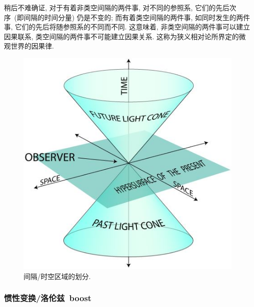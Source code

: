 稍后不难确证, 对于有着非类空间隔的两件事, 对不同的参照系, 它们的先后次序~(即间隔的时间分量) 仍是不变的; 而有着类空间隔的两件事, 如同时发生的两件事, 它们的先后将随参照系的不同而不同. 这意味着, 非类空间隔的两件事可以建立因果联系, 类空间隔的两件事不可能建立因果关系. 这称为狭义相对论所界定的微观世界的因果律.
\begin{figure}[!h]
\begin{center}
\includegraphics[width=4.2 cm]{pic/space.jpg}
\caption{间隔/时空区域的划分.}
\label{space}
\end{center}
\end{figure}


\subsubsection{惯性变换/洛伦兹~boost}

